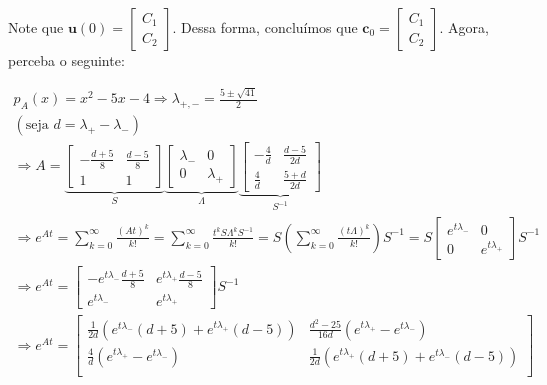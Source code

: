 \documentclass[leqno]{article}
\begin{document}
\begin{enumerate}
    Note que $\textbf{u}(0)=\begin{bmatrix}C_1\\
    C_2\end{bmatrix}$. Dessa forma, concluímos que $\textbf{c}_0=\begin{bmatrix}C_1\\
    C_2\end{bmatrix}$. Agora, perceba o seguinte:
    
    \begin{align*}
        p_A(x)=x^2-5x-4\Rightarrow \lambda_{+,-}=\frac{5\pm\sqrt{41}}{2}\\
        (\text{seja $d=\lambda_+-\lambda_-$})\\
        \Rightarrow A=\underbrace{\begin{bmatrix}-\frac{d+5}{8} & \frac{d-5}{8}\\
        1 & 1\end{bmatrix}}_S\underbrace{\begin{bmatrix}\lambda_- & 0\\
        0 & \lambda_+\end{bmatrix}}_{\Lambda}\underbrace{\begin{bmatrix}-\frac{4}{d} & \frac{d-5}{2d}\\
        \frac{4}{d} & \frac{5+d}{2d}\end{bmatrix}}_{S^{-1}}\\
        \Rightarrow e^{At}=\sum_{k=0}^{\infty}\frac{(At)^k}{k!}=\sum_{k=0}^{\infty}\frac{t^kS\Lambda^kS^{-1}}{k!}=S\left(\sum_{k=0}^{\infty}\frac{(t\Lambda)^k}{k!}\right)S^{-1}=S\begin{bmatrix}e^{t\lambda_-} & 0\\
        0 & e^{t\lambda_+}\end{bmatrix}S^{-1}\\
        \Rightarrow e^{At}=\begin{bmatrix}-e^{t\lambda_-}\frac{d+5}{8} & e^{t\lambda_+}\frac{d-5}{8}\\
        e^{t\lambda_-} & e^{t\lambda_+}\end{bmatrix}S^{-1}\\
        \Rightarrow e^{At}=\begin{bmatrix}\frac{1}{2d}(e^{t\lambda_-}(d+5)+e^{t\lambda_+}(d-5)) & \frac{d^2-25}{16d}(e^{t\lambda_+}-e^{t\lambda_-})\\
        \frac{4}{d}(e^{t\lambda_+}-e^{t\lambda_-}) & \frac{1}{2d}(e^{t\lambda_+}(d+5)+e^{t\lambda_-}(d-5))\\
        \end{bmatrix}\\

\end{align*}
\end{enumerate}
\end{document}

